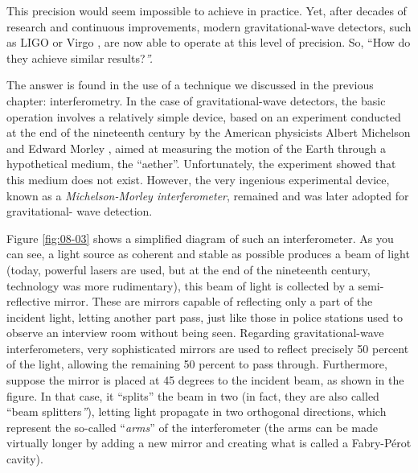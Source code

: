 This precision would seem impossible to achieve in practice. Yet, after decades of
research and continuous improvements, modern gravitational-wave detectors, such as LIGO
or Virgo , are now able to operate at this level
of precision. So, ``How do they achieve similar results?\emph{''.}

The answer is found in the use of a technique we discussed in the previous chapter:
interferometry. In the case of gravitational-wave detectors, the
basic operation involves a relatively simple device, based on an experiment conducted at
the end of the nineteenth century by the American physicists Albert
Michelson and Edward Morley , aimed at measuring
the motion of the Earth through a hypothetical medium, the
``aether''. Unfortunately, the experiment showed that this medium
does not exist. However, the very ingenious experimental device, known as a
\emph{Michelson-Morley
interferometer}, remained and
was later adopted for gravitational- wave detection.

Figure \ref{fig:08-03} shows a simplified diagram of such an interferometer. As
you can see, a light source as coherent and stable as possible produces a beam of light
(today, powerful lasers are used, but at the end of the nineteenth century, technology
was more rudimentary), this beam of light is collected by a semi-reflective
mirror. These are mirrors capable of reflecting
only a part of the incident light, letting another part pass, just like those in police
stations used to observe an interview room without being seen. Regarding
gravitational-wave interferometers, very sophisticated mirrors are used to reflect
precisely 50 percent of the light, allowing the remaining 50 percent to pass through.
Furthermore, suppose the mirror is placed at 45 degrees to the incident beam, as shown
in the figure. In that case, it ``splits'' the beam in two (in fact, they are also
called ``beam splitters\emph{''}), letting light propagate in two
orthogonal directions, which represent the so-called ``\emph{arms}'' of the
interferometer (the arms can be made virtually longer by adding a new mirror and
creating what is called a Fabry-Pérot cavity).

